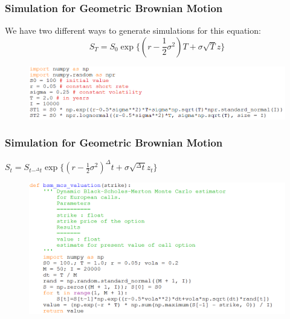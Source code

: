 \documentclass{beamer}
\begin{document}
\begin{frame}
\frametitle{Simulation for Geometric Brownian Motion}
\begin{center}
We have two different ways to generate simulations for this equation:\\
$$S_{T} = S_{0}\exp\{(r-\frac{1}{2}\sigma^{2})T + \sigma\sqrt{T}z\}$$
\end{center}
\begin{figure}[H]
	\includegraphics[scale=0.45]{simulate_GBM_T.png}
\end{figure}
\end{frame}

\begin{frame}
\frametitle{Simulation for Geometric Brownian Motion}
\begin{center}
$S_{t} = S_{t-^{\Delta}t}\exp\{(r-\frac{1}{2}\sigma^{2})^{\Delta}t + \sigma\sqrt{^{\Delta}t}z_{t}\}$
\end{center}
\begin{figure}[H]
	\includegraphics[scale=0.45]{mcs_gbm.png}
\end{figure}
\end{frame}
\end{document}
